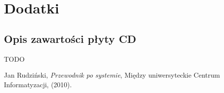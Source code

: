 \documentclass[licencjacka]{pracamgr}
\begin{document}
\chapter{Dodatki} \label{chap:dodatki}
\section{Opis zawartości płyty CD}
TODO

\begin{thebibliography}{99}

 Jan Rudziński, \textit{Przewodnik po systemie}, Między uniwersyteckie Centrum Informatyzacji, (2010).


\end{thebibliography}
\end{document}
